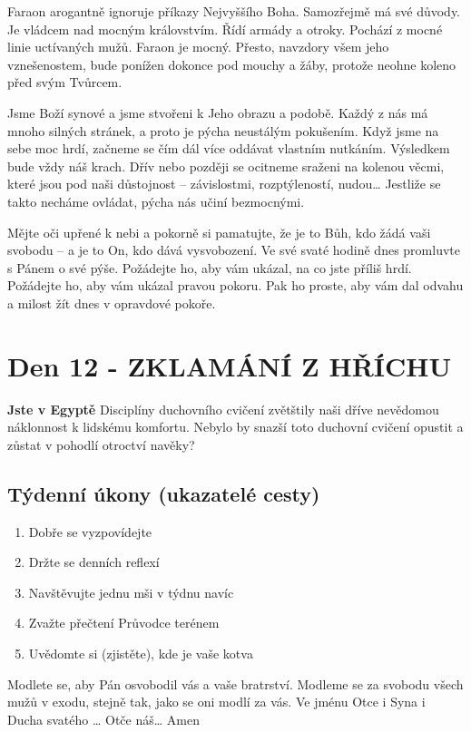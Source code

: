 \documentclass[11pt]{article}
\newcommand{\zacatekDruhyTyden}{
  \textbf{Jste v Egyptě} \newline
  Disciplíny duchovního cvičení zvětštily naši dříve nevědomou náklonnost k lidskému komfortu.
  Nebylo by snazší toto duchovní cvičení opustit a zůstat v pohodlí otroctví navěky?

  \subsection*{Týdenní úkony (ukazatelé cesty)}
\begin{enumerate}
  \item Dobře se vyzpovídejte
  \item Držte se denních reflexí
  \item Navštěvujte jednu mši v týdnu navíc
  \item Zvažte přečtení Průvodce terénem
  \item Uvědomte si (zjistěte), kde je vaše kotva
\end{enumerate}
Modlete se, aby Pán osvobodil vás a vaše bratrství. \newline
Modleme se za svobodu všech mužů v exodu, stejně tak, jako se oni modlí za vás.\newline
Ve jménu Otce i Syna i Ducha svatého …  Otče náš… Amen
}
\begin{document}
Faraon arogantně ignoruje příkazy Nejvyššího Boha. Samozřejmě má své důvody. Je vládcem nad mocným
královstvím. Řídí armády a otroky. Pochází z mocné linie uctívaných mužů. Faraon je mocný. Přesto,
navzdory všem jeho vznešenostem, bude ponížen dokonce pod mouchy a žáby, protože neohne koleno před
svým Tvůrcem.

Jsme Boží synové a jsme stvořeni k Jeho obrazu a podobě. Každý z nás má mnoho silných stránek, a proto
je pýcha neustálým pokušením. Když jsme na sebe moc hrdí, začneme se čím dál více oddávat vlastním
nutkáním. Výsledkem bude vždy náš krach. Dřív nebo později se ocitneme sraženi na kolenou věcmi, které
jsou pod naši důstojnost – závislostmi, rozptýleností, nudou… Jestliže se takto necháme ovládat, pýcha nás
učiní bezmocnými.

Mějte oči upřené k nebi a pokorně si pamatujte, že je to Bůh, kdo žádá vaši svobodu – a je to On, kdo dává
vysvobození. Ve své svaté hodině dnes promluvte s Pánem o své pýše. Požádejte ho, aby vám ukázal, na
co jste příliš hrdí. Požádejte ho, aby vám ukázal pravou pokoru. Pak ho proste, aby vám dal odvahu a milost
žít dnes v opravdové pokoře.

\newpage
\section{Den 12 - ZKLAMÁNÍ Z HŘÍCHU}
\zacatekDruhyTyden
\end{document}

